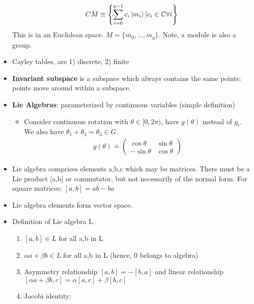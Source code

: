 \begin{itemize}
\begin{equation}
\begin{split}
    CM\equiv\left\{\sum_{i=0}^{q-1}c_i\ket{m_i}\vert c_i\in \mathbb{C} \forall i\right\}
    \end{split}\end{equation}
    This is in an Euclidean space. $M=\{m_0,...,m_q\}$. Note, a module is also a group.
    \item Cayley tables, are 1) discrete, 2) finite \cite{robinson}
    \item \textbf{Invariant subspace} is a subspace which always contains the same points: points move around within a subspace. \cite{robinson}
    \item \textbf{Lie Algebras}: parameterized by continuous variables (simple definition) \cite{robinson}
    \begin{itemize}
        \item Consider continuous rotation with $\theta\in[0,2\pi)$, have $g(\theta)$ instead of $g_i$. We also have $\theta_1+\theta_2=\theta_3\in G$. \cite{robinson}
        \begin{equation}\begin{split}
            g(\theta)\doteq \begin{pmatrix}\cos\theta&\sin\theta\\-\sin\theta&\cos\theta\end{pmatrix}
        \end{split}\end{equation}
    \end{itemize}
    \item Lie algebra comprises elements a,b,c which may be matrices. There must be a Lie product [a,b] or commutator, but not necessarily of the normal form. For square matrices: $[a,b]=ab-ba$ \cite{pfeifer}
    \item Lie algebra elements form vector space. \cite{pfeifer}
    \item Definition of Lie algebra L \cite{pfeifer}
    \begin{enumerate}\scriptsize
        \item $[a,b]\in L$ for all a,b in L \cite{pfeifer}
        \item $\alpha a+\beta b\in L$ for all a,b in L (hence, 0 belongs to algebra) \cite{pfeifer}
        \item Asymmetry relationship $[a,b]=-[b,a]$ and linear relationship $[\alpha a+\beta b,c]=\alpha[a,c]+\beta[b,c]$ \cite{pfeifer}
        \item Jacobi identity: \cite{pfeifer}
        \begin{equation}\begin{split}

\end{split}
\end{equation}
\end{enumerate}
\end{itemize}
